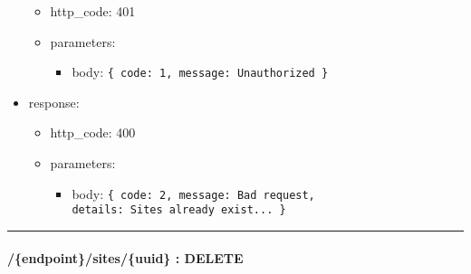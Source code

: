 \documentclass[
]{article}
\begin{document}
\begin{itemize}
  \begin{itemize}
  \item
    http\_code: 401
  \item
    parameters:

    \begin{itemize}
    \item
      body: \texttt{\{
      \textquotesingle{}code\textquotesingle{}:\ 1,\ 
      \textquotesingle{}message\textquotesingle{}:\ \textquotesingle{}Unauthorized\textquotesingle{}
      \}}
    \end{itemize}
  \end{itemize}
\item
  response:

  \begin{itemize}
  \item
    http\_code: 400
  \item
    parameters:

    \begin{itemize}
    \item
      body: \texttt{\{
      \textquotesingle{}code\textquotesingle{}:\ 2,
      \textquotesingle{}message\textquotesingle{}:\ \textquotesingle{}Bad\ request\textquotesingle{},
      \textquotesingle{}details\textquotesingle{}:\ \textquotesingle{}Sites\ already\ exist...\textquotesingle{}
      \}}
    \end{itemize}
  \end{itemize}
\end{itemize}

\begin{center}\rule{0.5\linewidth}{0.5pt}\end{center}

\hypertarget{header-n61294}{%
\paragraph{/\{endpoint\}/sites/\{uuid\} : DELETE}\label{header-n61294}}
\end{document}
